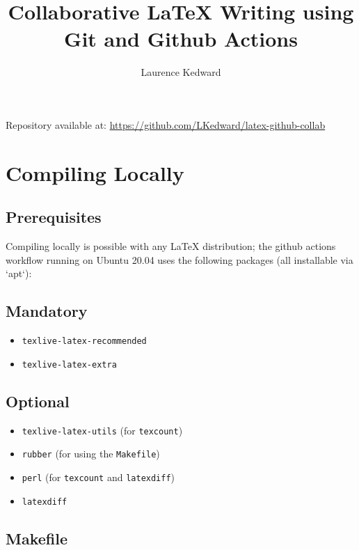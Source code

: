 \documentclass[]{article}
\title{Collaborative LaTeX Writing using Git and Github Actions}
\author{Laurence Kedward}
\begin{document}
\maketitle


Repository available at: \url{https://github.com/LKedward/latex-github-collab}

\section{Compiling Locally}

\subsection{Prerequisites}

Compiling locally is possible with any LaTeX distribution; the github actions workflow running on Ubuntu 20.04 uses the following packages (all installable via `apt`):

\subsection*{Mandatory}
\begin{itemize}

	\item \texttt{texlive-latex-recommended}
	\item \texttt{texlive-latex-extra}

\end{itemize}

\subsection*{Optional}
\begin{itemize}

	\item \texttt{texlive-latex-utils} \quad (for \texttt{texcount})
	\item \texttt{rubber} \quad (for using the \texttt{Makefile})
	\item \texttt{perl} \quad (for \texttt{texcount} and \texttt{latexdiff})
	\item \texttt{latexdiff}

\end{itemize}


\subsection{Makefile}
\end{document}
